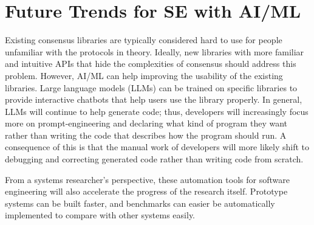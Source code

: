 \documentclass[11pt]{article}
\begin{document}
\section{Future Trends for SE with AI/ML}
Existing consensus libraries are typically considered hard to use for people unfamiliar with the protocols in theory. Ideally, new libraries with more familiar and intuitive APIs that hide the complexities of consensus should address this problem. However, AI/ML can help improving the usability of the existing libraries. Large language models (LLMs) can be trained on specific libraries to provide interactive chatbots that help users use the library properly. In general, LLMs will continue to help generate code; thus, developers will increasingly focus more on prompt-engineering and declaring what kind of program they want rather than writing the code that describes how the program should run. A consequence of this is that the manual work of developers will more likely shift to debugging and correcting generated code rather than writing code from scratch. 

From a systems researcher's perspective, these automation tools for software engineering will also accelerate the progress of the research itself. Prototype systems can be built faster, and benchmarks can easier be automatically implemented to compare with other systems easily.




\end{document}
